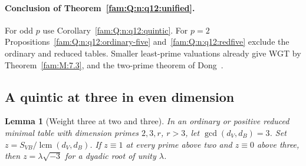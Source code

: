 \documentclass[11pt,a4paper]{article}
\numberwithin{equation}{section}
\newtheorem{lemma}[theorem]{Lemma}
\theoremstyle{remark}
\newcommand{\lcm}{\operatorname{lcm}}
\begin{document}
\paragraph{Conclusion of Theorem~\ref{fam:Q:n:q12:unified}.}
For odd $p$ use Corollary~\ref{fam:Q:n:q12:quintic}. For $p=2$ Propositions~\ref{fam:Q:n:q12:ordinary-five} and~\ref{fam:Q:n:q12:redfive} exclude the ordinary and reduced tables. Smaller least-prime valuations already give WGT by
Theorem~\ref{fam:M:7.3}, and the two-prime theorem of Dong~\cite[Theorem~3.1]{DongWeakIntegral}.

\subsection{A quintic at three in even dimension}\label{fam:Q:sec:6}

\begin{lemma}[Weight three at two and three]\label{fam:Q:6.1}
In an ordinary or positive reduced minimal table with dimension primes $2,3,r$, $r>3$,
let $\gcd(d_V,d_B)=3$. Set $z=S_{VB}/\lcm(d_V,d_B)$.
If $z\equiv1$ at every prime above two and $z\equiv0$ above three,
then $z=\lambda\sqrt{-3}$ for a dyadic root of unity $\lambda$.
\end{lemma}
\end{document}
